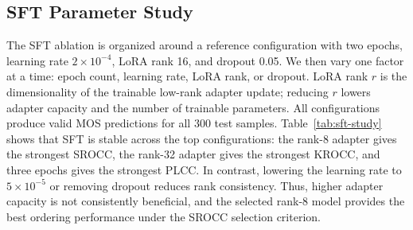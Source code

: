 \documentclass[10pt,twocolumn,letterpaper]{article}
\begin{document}
\subsection{SFT Parameter Study}
The SFT ablation is organized around a reference configuration with two epochs, learning rate $2{\times}10^{-4}$, LoRA rank 16, and dropout 0.05. We then vary one factor at a time: epoch count, learning rate, LoRA rank, or dropout. LoRA rank $r$ is the dimensionality of the trainable low-rank adapter update; reducing $r$ lowers adapter capacity and the number of trainable parameters. All configurations produce valid MOS predictions for all 300 test samples. Table~\ref{tab:sft-study} shows that SFT is stable across the top configurations: the rank-8 adapter gives the strongest SROCC, the rank-32 adapter gives the strongest KROCC, and three epochs gives the strongest PLCC. In contrast, lowering the learning rate to $5{\times}10^{-5}$ or removing dropout reduces rank consistency. Thus, higher adapter capacity is not consistently beneficial, and the selected rank-8 model provides the best ordering performance under the SROCC selection criterion.

\begin{table}[t]
  \centering
  \caption{SFT ablation study around a rank-16 reference configuration. All runs have 100\% prediction coverage.}
  \label{tab:sft-study}
  \scriptsize
  \setlength{\tabcolsep}{2pt}
\end{table}
\end{document}
